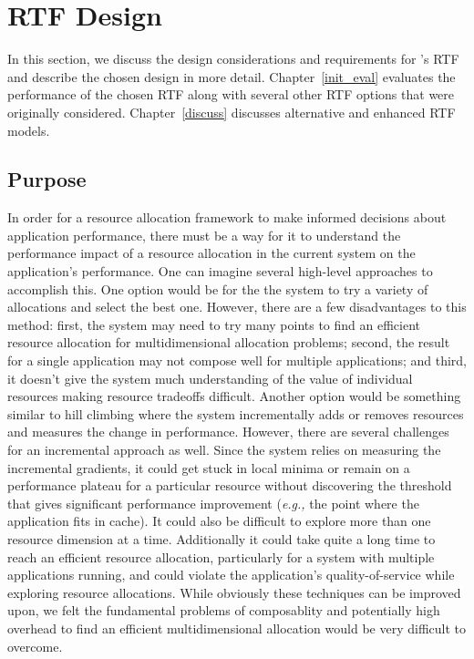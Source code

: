 \section{RTF Design}\label{RTFs}
In this section, we discuss the design considerations and requirements for \pacora's RTF and describe the chosen design in more detail. Chapter~\ref{init_eval} evaluates the performance of the chosen RTF along with several other RTF options that were originally considered. Chapter~\ref{discuss} discusses alternative and enhanced RTF models.

\subsection{Purpose}

In order for a resource allocation framework to make informed decisions about application performance, there must be a way for it to understand the performance impact of a resource allocation in the current system on the application's performance.  One can imagine several high-level approaches to accomplish this. One option would be for the the system to try a variety of allocations and select the best one.  However, there are a few disadvantages to this method: first, the system may need to try many points to find an efficient resource allocation for multidimensional allocation problems; second, the result for a single application may not compose well for multiple applications; and third, it doesn't give the system much understanding of the value of individual resources making resource tradeoffs difficult.  Another option would be something similar to hill climbing where the system incrementally adds or removes resources and measures the change in performance.  However, there are several challenges for an incremental approach as well.  Since the system relies on measuring the incremental gradients, it could get stuck in local minima or remain on a performance plateau for a particular resource without discovering the threshold that gives significant performance improvement (\emph{e.g.,} the point where the application fits in cache).  It could also be difficult to explore more than one resource dimension at a time. Additionally it could take quite a long time to reach an efficient resource allocation, particularly for a system with multiple applications running, and could violate the application's quality-of-service while exploring resource allocations.  While obviously these techniques can be improved upon, we felt the fundamental problems of composablity and potentially high overhead to find an efficient multidimensional allocation would be very difficult to overcome. 

